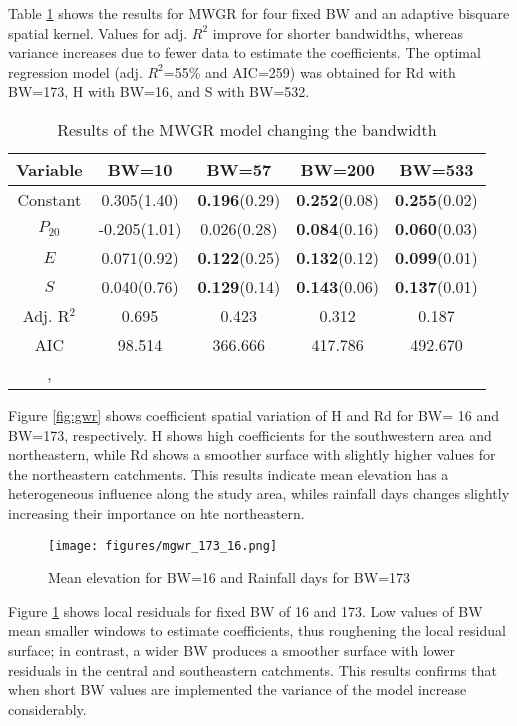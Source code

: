 \documentclass[
  manuscript=article,  
  layout=preprint,  
  year=2023,
  volume=0,
]{format}
\begin{document}
\par Table \ref{tab:mgwr} shows the results for MWGR for four fixed BW and an adaptive bisquare spatial kernel. Values for adj. $R^2$ improve for shorter bandwidths, whereas variance increases due to fewer data to estimate the coefficients. The optimal regression model (adj. $R^2$=55\% and AIC=259) was obtained for Rd with BW=173, H with BW=16, and S with BW=532.

\begin{table}[htbp]\centering
\caption{Results of the MWGR model changing the bandwidth}
\label{tab:mgwr}
\begin{tabular}{c c c c c}
\toprule
\textbf{Variable} & \textbf{BW=10} & \textbf{BW=57} & \textbf{BW=200} & \textbf{BW=533} \\ 
\midrule
Constant&0.305(1.40)&\textbf{0.196}(0.29)&\textbf{0.252}(0.08)&\textbf{0.255}(0.02)  \\
$P_{20}$&-0.205(1.01)&0.026(0.28)&\textbf{0.084}(0.16)&\textbf{0.060}(0.03) \\
$E$&0.071(0.92)&\textbf{0.122}(0.25)&\textbf{0.132}(0.12)&\textbf{0.099}(0.01) \\
$S$&0.040(0.76)&\textbf{0.129}(0.14)&\textbf{0.143}(0.06)&\textbf{0.137}(0.01) \\
\midrule
Adj. R$^{2}$&0.695&0.423&0.312&0.187    \\
AIC&98.514&366.666&417.786&492.670   \\
\bottomrule
\addlinespace[1ex]
\multicolumn{3}{l}{\textbf{$p<0.05$}}, 
\end{tabular}
\end{table}

\par Figure \ref{fig:gwr} shows coefficient spatial variation of H and Rd for BW= 16 and BW=173, respectively. H shows high coefficients for the southwestern area and northeastern, while Rd shows a smoother surface with slightly higher values for the northeastern catchments. This results indicate mean elevation has a heterogeneous influence along the study area, whiles rainfall days changes slightly increasing their importance on hte northeastern.

\begin{figure}[ht!]
    \centering
      {\texttt{[image: figures/mgwr\_173\_16.png]}}
    \caption{Mean elevation for BW=16 and Rainfall days for BW=173}
    \label{fig:r2}
\end{figure}

\par Figure \ref{fig:r2} shows local residuals for fixed BW of 16 and 173. Low values of BW mean smaller windows to estimate coefficients, thus roughening the local residual surface; in contrast, a wider BW produces a smoother surface with lower residuals in the central and southeastern catchments. This results confirms that when short BW values are implemented the variance of the model increase considerably.
\end{document}
